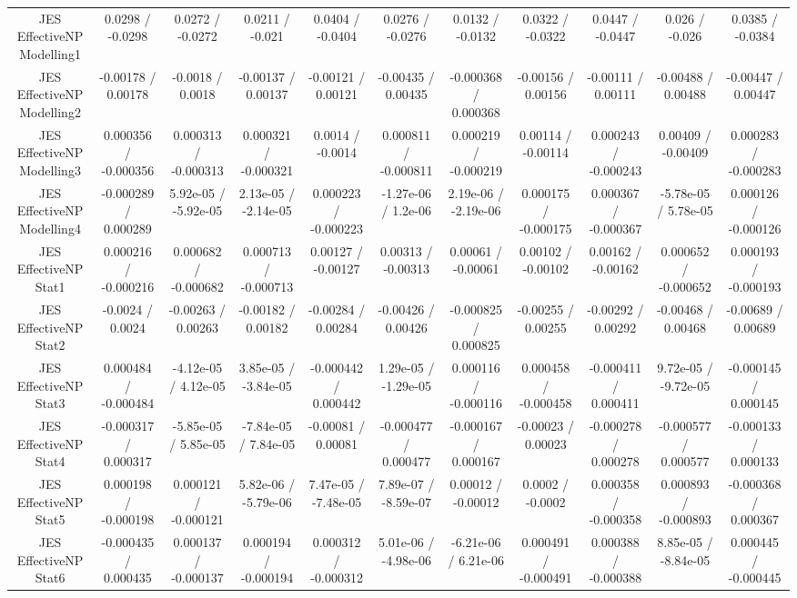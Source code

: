 \begin{table}[htbp]
\begin{center}
\begin{tabular}{|c|c|c|c|c|c|c|c|c|c|c|}
  JES EffectiveNP Modelling1 & 0.0298 / -0.0298 & 0.0272 / -0.0272 & 0.0211 / -0.021 & 0.0404 / -0.0404 & 0.0276 / -0.0276 & 0.0132 / -0.0132 & 0.0322 / -0.0322 & 0.0447 / -0.0447 & 0.026 / -0.026 & 0.0385 / -0.0384 \\ 
  JES EffectiveNP Modelling2 & -0.00178 / 0.00178 & -0.0018 / 0.0018 & -0.00137 / 0.00137 & -0.00121 / 0.00121 & -0.00435 / 0.00435 & -0.000368 / 0.000368 & -0.00156 / 0.00156 & -0.00111 / 0.00111 & -0.00488 / 0.00488 & -0.00447 / 0.00447 \\ 
  JES EffectiveNP Modelling3 & 0.000356 / -0.000356 & 0.000313 / -0.000313 & 0.000321 / -0.000321 & 0.0014 / -0.0014 & 0.000811 / -0.000811 & 0.000219 / -0.000219 & 0.00114 / -0.00114 & 0.000243 / -0.000243 & 0.00409 / -0.00409 & 0.000283 / -0.000283 \\ 
  JES EffectiveNP Modelling4 & -0.000289 / 0.000289 & 5.92e-05 / -5.92e-05 & 2.13e-05 / -2.14e-05 & 0.000223 / -0.000223 & -1.27e-06 / 1.2e-06 & 2.19e-06 / -2.19e-06 & 0.000175 / -0.000175 & 0.000367 / -0.000367 & -5.78e-05 / 5.78e-05 & 0.000126 / -0.000126 \\ 
  JES EffectiveNP Stat1 & 0.000216 / -0.000216 & 0.000682 / -0.000682 & 0.000713 / -0.000713 & 0.00127 / -0.00127 & 0.00313 / -0.00313 & 0.00061 / -0.00061 & 0.00102 / -0.00102 & 0.00162 / -0.00162 & 0.000652 / -0.000652 & 0.000193 / -0.000193 \\ 
  JES EffectiveNP Stat2 & -0.0024 / 0.0024 & -0.00263 / 0.00263 & -0.00182 / 0.00182 & -0.00284 / 0.00284 & -0.00426 / 0.00426 & -0.000825 / 0.000825 & -0.00255 / 0.00255 & -0.00292 / 0.00292 & -0.00468 / 0.00468 & -0.00689 / 0.00689 \\ 
  JES EffectiveNP Stat3 & 0.000484 / -0.000484 & -4.12e-05 / 4.12e-05 & 3.85e-05 / -3.84e-05 & -0.000442 / 0.000442 & 1.29e-05 / -1.29e-05 & 0.000116 / -0.000116 & 0.000458 / -0.000458 & -0.000411 / 0.000411 & 9.72e-05 / -9.72e-05 & -0.000145 / 0.000145 \\ 
  JES EffectiveNP Stat4 & -0.000317 / 0.000317 & -5.85e-05 / 5.85e-05 & -7.84e-05 / 7.84e-05 & -0.00081 / 0.00081 & -0.000477 / 0.000477 & -0.000167 / 0.000167 & -0.00023 / 0.00023 & -0.000278 / 0.000278 & -0.000577 / 0.000577 & -0.000133 / 0.000133 \\ 
  JES EffectiveNP Stat5 & 0.000198 / -0.000198 & 0.000121 / -0.000121 & 5.82e-06 / -5.79e-06 & 7.47e-05 / -7.48e-05 & 7.89e-07 / -8.59e-07 & 0.00012 / -0.00012 & 0.0002 / -0.0002 & 0.000358 / -0.000358 & 0.000893 / -0.000893 & -0.000368 / 0.000367 \\ 
  JES EffectiveNP Stat6 & -0.000435 / 0.000435 & 0.000137 / -0.000137 & 0.000194 / -0.000194 & 0.000312 / -0.000312 & 5.01e-06 / -4.98e-06 & -6.21e-06 / 6.21e-06 & 0.000491 / -0.000491 & 0.000388 / -0.000388 & 8.85e-05 / -8.84e-05 & 0.000445 / -0.000445 \\ 

\end{tabular}
\end{center}
\end{table}
